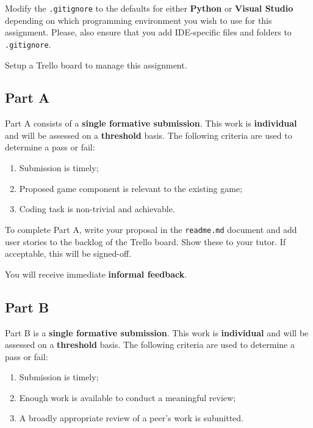\documentclass{../fal_assignment}
\begin{document}
Modify the \texttt{.gitignore} to the defaults for either \textbf{Python} or \textbf{Visual Studio} depending on which programming environment you wish to use for this assignment. Please, also ensure that you add IDE-specific files and folders to \texttt{.gitignore}. 


Setup a Trello board to manage this assignment. 

\subsection*{Part A}

Part A consists of a \textbf{single formative submission}. This work is \textbf{individual} and will be assessed on a \textbf{threshold} basis. The following criteria are used to determine a pass or fail:

\begin{enumerate}[label=(\alph*)]
	\item Submission is timely;
	\item Proposed game component is relevant to the existing game;
	\item Coding task is non-trivial and achievable.
\end{enumerate}

To complete Part A, write your proposal in the \texttt{readme.md} document and add user stories to the backlog of the Trello board. Show these to your tutor.  If acceptable, this will be signed-off. 

You will receive immediate \textbf{informal feedback}.

\subsection*{Part B}

Part B is a \textbf{single formative submission}. This work is \textbf{individual} and will be assessed on a \textbf{threshold} basis. The following criteria are used to determine a pass or fail:

\begin{enumerate}[label=(\alph*)]
	\item Submission is timely;
	\item Enough work is available to conduct a meaningful review;
	\item A broadly appropriate review of a peer's work is submitted.
\end{enumerate}
\end{document}
